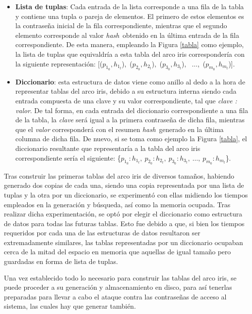 \documentclass[12pt,spanish,listoffigures,listoftables]{tfgetsinf}
\newcommand{\hash}{\textit{hash}}
\begin{document}
\begin{itemize}

    \item \textbf{Lista de tuplas}: Cada entrada de la lista corresponde a una fila de la tabla y contiene una tupla o pareja de elementos. El primero de estos elementos es la contraseña inicial de la fila correspondiente, mientras que el segundo elemento corresponde al valor \hash~obtenido en la última entrada de la fila correspondiente. De esta manera, empleando la Figura \ref{tabla} como ejemplo, la lista de tuplas que equivaldría a esta tabla del arco iris correspondería con la siguiente representación: [($p_{1_0}, h_{1_t}$),~($p_{2_0}, h_{2_t}$),~($p_{3_0}, h_{3_t}$), ~$\dots$,~($p_{m_0}, h_{m_t}$)].
    
    \item \textbf{Diccionario}: esta estructura de datos viene como anillo al dedo a la hora de representar tablas del arco iris, debido a su estructura interna siendo cada entrada compuesta de una clave y su valor correspondiente, tal que \textit{clave : valor}. De tal forma, en cada entrada del diccionario correspondiente a una fila de la tabla, la \textit{clave} será igual a la primera contraseña de dicha fila, mientras que el \textit{valor} corresponderá con el resumen \hash~generado en la última columna de dicha fila. De nuevo, si se toma como ejemplo la Figura \ref{tabla}, el diccionario resultante que representaría a la tabla del arco iris correspondiente sería el siguiente: \{$p_{1_0} : h_{1_t},~p_{2_0} : h_{2_t},~p_{3_0} : h_{3_t}, ~\dots,~p_{m_0} : h_{m_t}$\}.
    
\end{itemize}

Tras construir las primeras tablas del arco iris de diversos tamaños, habiendo generado dos copias de cada una, siendo una copia representada por una lista de tuplas y la otra por un diccionario, se experimentó con ellas midiendo los tiempos empleados en la generación y búsqueda, así como la memoria ocupada. Tras realizar dicha experimentación, se optó por elegir el diccionario como estructura de datos para todas las futuras tablas. Esto fue debido a que, si bien los tiempos requeridos por cada una de las estructuras de datos resultaron ser extremadamente similares, las tablas representadas por un diccionario ocupaban cerca de la mitad del espacio en memoria que aquellas de igual tamaño pero guardadas en forma de lista de tuplas.

Una vez establecido todo lo necesario para construir las tablas del arco iris, se puede proceder a su generación y almacenamiento en disco, para así tenerlas preparadas para llevar a cabo el ataque contra las contraseñas de acceso al sistema, las cuales hay que generar también.
\end{document}
